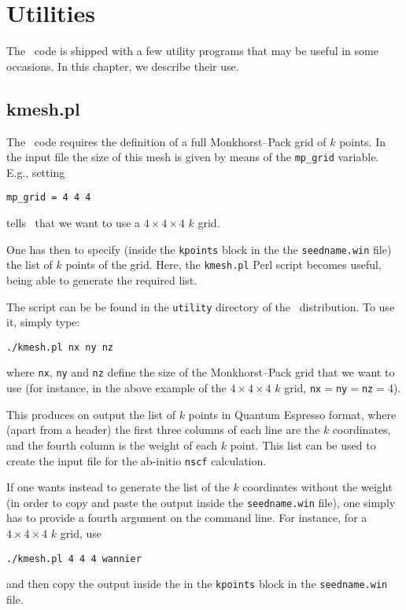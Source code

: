 \chapter{Utilities}\label{ch:utilities}

The \wannier\ code is shipped with a few utility programs that may be
useful in some occasions. In this chapter, we describe their use.

\section{kmesh.pl}
The \wannier\ code requires the definition of a full Monkhorst--Pack
grid of $k$ points.
In the input file 
the size of this mesh is given by means of the \texttt{mp\_grid} variable. E.g.,
setting
\begin{verbatim}
mp_grid = 4 4 4
\end{verbatim}
tells \wannier\ that we want to use a $4\times 4\times 4$ $k$ grid.

One has then to specify (inside the \texttt{kpoints} block in the 
the \texttt{seedname.win} file) the list of $k$ points of the grid.
Here, the \texttt{kmesh.pl} Perl script becomes 
useful, being able to generate the required list.

The script can be be found in the
\texttt{utility} directory of the \wannier\ distribution.
To use it, simply type:
\begin{verbatim}
./kmesh.pl nx ny nz
\end{verbatim}
where \verb|nx|, \verb|ny| and \verb|nz| define the size of the
Monkhorst--Pack grid that we want to use (for instance, in the above example of the
$4\times 4\times 4$ $k$ grid, 
 \verb|nx|$=$\verb|ny|$=$\verb|nz|$=$4).

This produces on output the list of $k$ points in Quantum
Espresso format, where (apart from a header) the first three columns
of each line are the $k$ coordinates, and the fourth column is the weight
of each $k$ point. This list can be used to create the input file
for the ab-initio \verb|nscf| calculation.

If one wants instead to generate the list of the $k$ coordinates
without the weight (in order to copy and paste the output inside the
\texttt{seedname.win} file), one simply has to provide a fourth
argument on the command line. For instance, for a $4\times 4\times 4$
$k$ grid,
use
\begin{verbatim}
./kmesh.pl 4 4 4 wannier
\end{verbatim}
and then copy the output inside the in the \texttt{kpoints} block in the \texttt{seedname.win} file.

